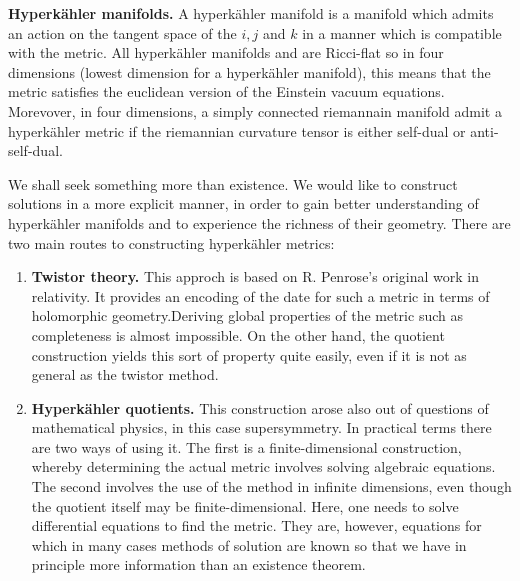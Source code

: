 \documentclass{worksheetclass}
\begin{document}
        \begin{result}
            \textbf{Hyperkähler manifolds.} A hyperkähler manifold is a manifold which admits an action on the tangent space of the $i,j$ and $k$ in a manner which is compatible with the metric. All hyperkähler manifolds and are Ricci-flat so in four dimensions (lowest dimension for a hyperkähler manifold), this means that the metric satisfies the euclidean version of the Einstein vacuum equations. Morevover, in four dimensions, a simply connected riemannain manifold admit a hyperkähler metric if the riemannian curvature tensor is either self-dual or anti-self-dual.
        \end{result}

        We shall seek something more than existence. We would like to construct solutions in a more explicit manner, in order to gain better understanding of hyperkähler manifolds and to experience the richness of their geometry. There are two main routes to constructing hyperkähler metrics:
        \begin{enumerate}
            \item \textbf{Twistor theory.} This approch is based on R. Penrose's original work in relativity. It provides an encoding of the date for such a metric in terms of holomorphic geometry.Deriving global properties of the metric such as completeness is almost impossible. On the other hand, the quotient construction yields this sort of property quite easily, even if it is not as general as the twistor method.
            \item \textbf{Hyperkähler quotients.} This construction arose also out of questions of mathematical physics, in this case supersymmetry. In practical terms there are two ways of using it. The first is a finite-dimensional construction, whereby determining the actual metric involves solving algebraic equations. The second involves the use of the method in infinite dimensions, even though the quotient itself may be finite-dimensional. Here, one needs to solve differential equations to find the metric. They are, however, equations for which in many cases methods of solution are known so that we have in principle more information than an existence theorem.
        \end{enumerate}
\end{document}
